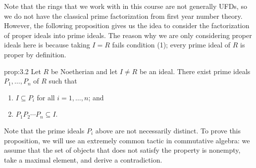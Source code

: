 Note that the rings that we work with in this course are not generally UFDs, 
so we do not have the classical prime factorization from first year number 
theory. However, the following proposition gives us the idea to 
consider the factorization of proper ideals into prime ideals. 
The reason why we are only considering proper ideals here is because 
taking $I = R$ fails condition (1); every prime ideal of $R$ is proper by 
definition.

\begin{prop}{prop:3.2}
    Let $R$ be Noetherian and let $I \neq R$ be an ideal. 
    There exist prime ideals $P_1, \dots, P_n$ of $R$ such that 
    \begin{enumerate}[(1)]
        \item $I \subseteq P_i$ for all $i = 1, \dots, n$; and 
        \item $P_1P_2 \cdots P_n \subseteq I$. 
    \end{enumerate}
\end{prop}

Note that the prime ideals $P_i$ above are not necessarily distinct. 
To prove this proposition, we will use an extremely common tactic in 
commutative algebra: we assume that the set of objects that does 
not satisfy the property is nonempty, take a maximal element, and derive 
a contradiction. 

